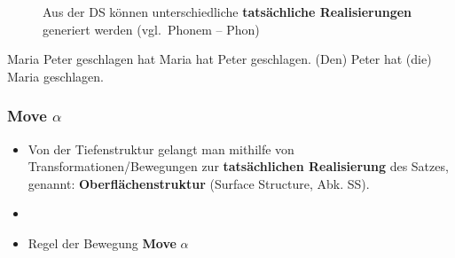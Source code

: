 \begin{frame}

\begin{figure}[b]
	\begin{minipage}[b]{.35\textwidth}
	Aus der DS können unterschiedliche
	 \textbf{tatsächliche Realisierungen} 
	 generiert werden (vgl.\ Phonem -- Phon)
	\end{minipage}
  	\begin{minipage}[b]{0.6\textwidth}
	\centering
  	\end{minipage}  
\end{figure}

\eal
\ex Maria Peter geschlagen hat
\ex Maria hat Peter geschlagen.
\ex (Den) Peter hat (die) Maria geschlagen.
\zl

\end{frame}


\begin{frame}
\frametitle{Move $\alpha$}

\begin{itemize}
	\item Von der Tiefenstruktur gelangt man mithilfe von Transformationen/Bewegungen zur \textbf{tatsächlichen Realisierung} des Satzes, genannt: \textbf{Oberflächenstruktur} (Surface Structure, Abk. SS).
	\item[]
	\item Regel der Bewegung \ras \textbf{Move} $\alpha$
\end{itemize}

\end{frame}



